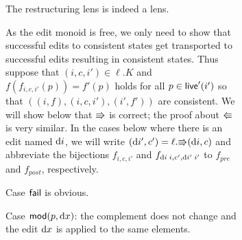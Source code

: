 \begin{figure}
\begin{figure}
\iffull
\begin{theorem}
The restructuring lens is indeed a lens.
\end{theorem}
\begin{pf}
  As the edit monoid is free, we only need to show that successful
  edits to consistent states get transported to successful edits
  resulting in consistent states. Thus suppose that
  $(i,c,i')\in\ell.K$ and $f(f_{i,c,i'}(p))=f'(p)$ holds for all
  $p\in\mathsf{live}'(i')$ so that $((i,f),(i,c,i'),(i',f'))$ are consistent. We
  will show below that $\mathord{\Rrightarrow}$ is correct; the proof about $\mathord{\Lleftarrow}$ is very
  similar. In the cases below where there is an edit named $\textrm{d} i$, we will
  write $(\textrm{d} i',c')=\ell.\mathord{\Rrightarrow}(\textrm{d} i,c)$ and abbreviate the bijections
  $f_{i,c,i'}$ and $f_{\textrm{d} i\;i,c',\textrm{d} i'\;i'}$ to $f_{pre}$ and $f_{post}$,
  respectively.

  Case $\mathsf{fail}$ is obvious. 

  Case $\mathsf{mod}(p,\textrm{d} x)$: the complement does not change and the edit
  $\textrm{d} x$ is applied to the same elements.


\end{pf}
\end{figure}
\end{figure}
